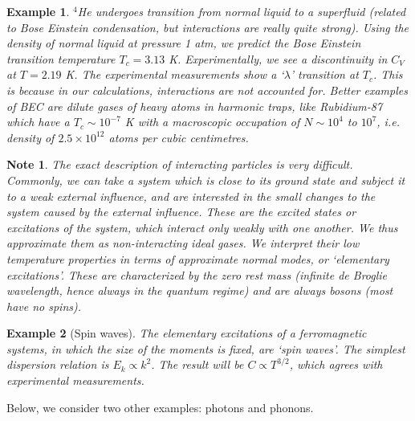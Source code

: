 \documentclass[a4paper]{article}
\newtheorem{eg}{Example}[section]
\newtheorem{Note}{Note}[section]
\theoremstyle{new}
\begin{document}
\begin{eg}
$^4$He undergoes transition from normal liquid to a superfluid (related to Bose Einstein condensation, but interactions are really quite strong). Using the density of normal liquid at pressure 1 atm, we predict the Bose Einstein transition temperature $T_c=3.13$ K. Experimentally, we see a discontinuity in $C_V$ at $T=2.19$ K. The experimental measurements show a `$\lambda$' transition at $T_c$. This is because in our calculations, interactions are not accounted for. Better examples of BEC are dilute gases of heavy atoms in harmonic traps, like Rubidium-87 which have a $T_c\sim 10^{-7}$ K with a macroscopic occupation of $N\sim10^4$ to $10^7$, i.e. density of $2.5\times10^{12}$ atoms per cubic centimetres. 
\end{eg}
\begin{Note}
The exact description of interacting particles is very difficult. Commonly, we can take a system which is close to its ground state and subject it to a weak external influence, and are interested in the small changes to the system caused by the external influence. These are the excited states or excitations of the system, which interact only weakly with one another. We thus approximate them as non-interacting ideal gases. We interpret their low temperature properties in terms of approximate normal modes, or `elementary excitations'. These are characterized by the zero rest mass (infinite de Broglie wavelength, hence always in the quantum regime) and are always bosons (most have no spins).
\end{Note}
\begin{eg}[Spin waves]
The elementary excitations of a ferromagnetic systems, in which the size of the moments is fixed, are `spin waves'. The simplest dispersion relation is $E_k\propto k^2$. The result will be $C\propto T^{3/2}$, which agrees with experimental measurements.
\end{eg}
Below, we consider two other examples: photons and phonons.
\newpage
\end{document}

